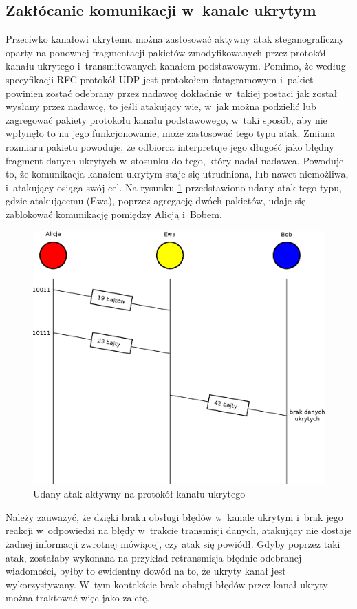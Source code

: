 \documentclass[a4paper, twoside, 12pt]{report}
\begin{document}
       \subsection{Zakłócanie komunikacji w~kanale ukrytym}
       Przeciwko kanałowi ukrytemu można zastosować aktywny atak steganograficzny
       oparty na ponownej fragmentacji pakietów zmodyfikowanych przez protokół
       kanału ukrytego i~transmitowanych kanałem podstawowym. Pomimo, że według
       specyfikacji RFC protokół UDP jest protokołem datagramowym i~pakiet powinien
       zostać odebrany przez nadawcę dokładnie w~takiej postaci jak został wysłany przez
       nadawcę, to jeśli atakujący wie, w~jak można podzielić lub zagregować
       pakiety protokołu kanału podstawowego, w~taki sposób, aby nie wpłynęło to na
       jego funkcjonowanie, może zastosować tego typu atak. Zmiana rozmiaru pakietu
       powoduje, że odbiorca interpretuje jego długość jako błędny fragment danych
       ukrytych w~stosunku do tego, który nadał nadawca. Powoduje to, że komunikacja
       kanałem ukrytym staje się utrudniona, lub nawet niemożliwa, i~atakujący osiąga
       swój cel. Na rysunku \ref{UDANYATAKAKTYWNY} przedstawiono udany atak tego typu,
       gdzie atakującemu (Ewa), poprzez agregację dwóch pakietów,
       udaje się zablokować komunikację pomiędzy Alicją i~Bobem.
        \begin{figure}[h]
                \centering
                \includegraphics[scale=0.7]{udany_atak}
                \caption{Udany atak aktywny na protokół kanału ukrytego}
                \label{UDANYATAKAKTYWNY}
        \end{figure}
       Należy zauważyć, że dzięki braku obsługi błędów w~kanale ukrytym
       i~brak jego reakcji w~odpowiedzi na błędy w~trakcie transmisji danych, atakujący
       nie dostaje żadnej informacji zwrotnej mówiącej, czy atak się powiódł. Gdyby
       poprzez taki atak, zostałaby wykonana na przykład retransmisja błędnie odebranej
       wiadomości, byłby to ewidentny dowód na to, że ukryty kanał jest wykorzystywany.
       W~tym kontekście brak obsługi błędów przez kanał ukryty można traktować więc
       jako zaletę.
\end{document}
